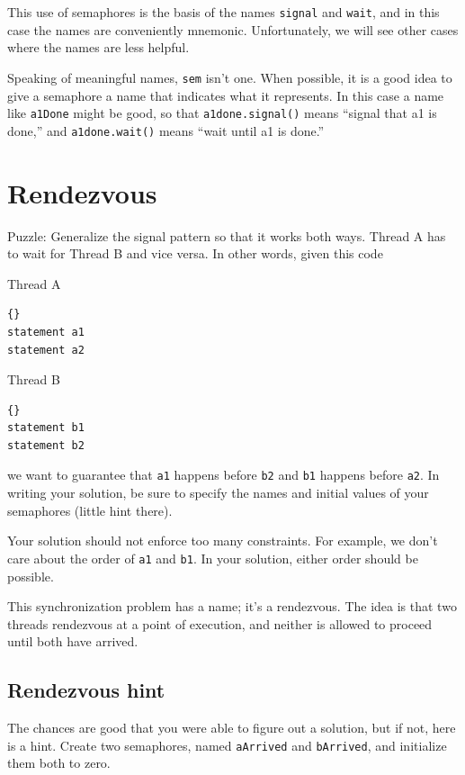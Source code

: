 \documentclass{book}
\newcommand{\clearemptydoublepage}{\newpage\cleardoublepage}
\begin{document}
This use of semaphores is the basis of the names {\tt signal}
and {\tt wait}, and in this case the names are conveniently
mnemonic.  Unfortunately, we will see other cases where the
names are less helpful.

Speaking of meaningful names, {\tt sem} isn't one.  When
possible, it is a good idea to give a semaphore a name
that indicates what it represents.  In this case a name like
{\tt a1Done} might be good, so that {\tt a1done.signal()} means
``signal that a1 is done,'' and {\tt a1done.wait()} means
``wait until a1 is done.''


\section{Rendezvous}
\label{rendezvous}

Puzzle: Generalize the signal pattern so that it works both
ways.  Thread A has to wait for Thread B and vice versa.  In other
words, given this code

\begin{minipage}[t]{2in}
Thread A
\begin{lstlisting}{}
statement a1
statement a2
\end{lstlisting}
\end{minipage}
\hfill
\begin{minipage}[t]{2in}
Thread B
\begin{lstlisting}{}
statement b1
statement b2
\end{lstlisting}
\end{minipage}
%
we want to guarantee that {\tt a1} happens before {\tt b2} and
{\tt b1} happens before {\tt a2}.  In writing your solution, be sure
to specify the names and initial values of your semaphores
(little hint there).

Your solution should not enforce too many constraints.  For example,
we don't care about the order of {\tt a1} and {\tt b1}.  In your
solution, either order should be possible.

This synchronization problem has a name; it's a
rendezvous.  The idea is that two threads rendezvous
at a point of execution, and neither is allowed to proceed
until both have arrived.

\clearemptydoublepage
\subsection{Rendezvous hint}

The chances are good that you were able to figure out a solution,
but if not, here is a hint.  Create two semaphores, named {\tt aArrived}
and {\tt bArrived}, and initialize them both to zero.
\end{document}

